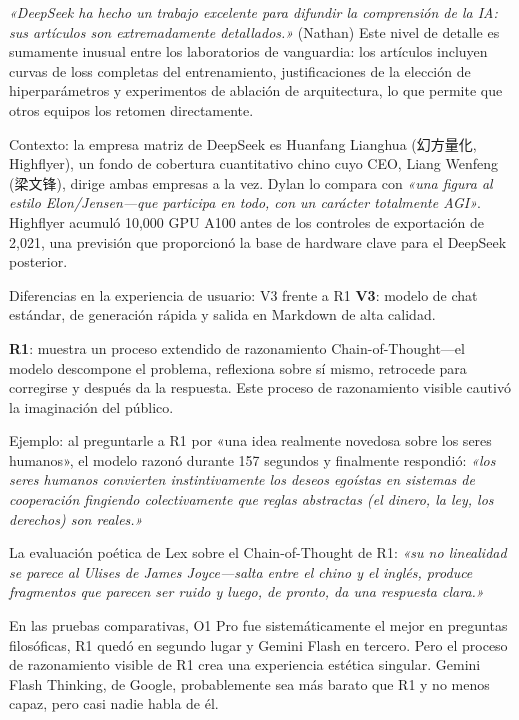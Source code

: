 \documentclass[a4paper]{article}
\begin{document}
\textit{«DeepSeek ha hecho un trabajo excelente para difundir la comprensión de la IA: sus artículos son extremadamente detallados.»} (Nathan) Este nivel de detalle es sumamente inusual entre los laboratorios de vanguardia: los artículos incluyen curvas de loss completas del entrenamiento, justificaciones de la elección de hiperparámetros y experimentos de ablación de arquitectura, lo que permite que otros equipos los retomen directamente.

Contexto: la empresa matriz de DeepSeek es Huanfang Lianghua (幻方量化, Highflyer), un fondo de cobertura cuantitativo chino cuyo CEO, Liang Wenfeng (梁文锋), dirige ambas empresas a la vez. Dylan lo compara con \textit{«una figura al estilo Elon/Jensen—que participa en todo, con un carácter totalmente AGI»}. Highflyer acumuló 10,000 GPU A100 antes de los controles de exportación de 2,021, una previsión que proporcionó la base de hardware clave para el DeepSeek posterior.

\begin{importantbox}{Diferencias en la experiencia de usuario: V3 frente a R1}
\textbf{V3}: modelo de chat estándar, de generación rápida y salida en Markdown de alta calidad.

\textbf{R1}: muestra un proceso extendido de razonamiento Chain-of-Thought—el modelo descompone el problema, reflexiona sobre sí mismo, retrocede para corregirse y después da la respuesta. Este proceso de razonamiento visible cautivó la imaginación del público.

Ejemplo: al preguntarle a R1 por «una idea realmente novedosa sobre los seres humanos», el modelo razonó durante 157 segundos y finalmente respondió: \textit{«los seres humanos convierten instintivamente los deseos egoístas en sistemas de cooperación fingiendo colectivamente que reglas abstractas (el dinero, la ley, los derechos) son reales.»}

La evaluación poética de Lex sobre el Chain-of-Thought de R1: \textit{«su no linealidad se parece al Ulises de James Joyce—salta entre el chino y el inglés, produce fragmentos que parecen ser ruido y luego, de pronto, da una respuesta clara.»}

En las pruebas comparativas, O1 Pro fue sistemáticamente el mejor en preguntas filosóficas, R1 quedó en segundo lugar y Gemini Flash en tercero. Pero el proceso de razonamiento visible de R1 crea una experiencia estética singular. Gemini Flash Thinking, de Google, probablemente sea más barato que R1 y no menos capaz, pero casi nadie habla de él.
\end{importantbox}
\end{document}
